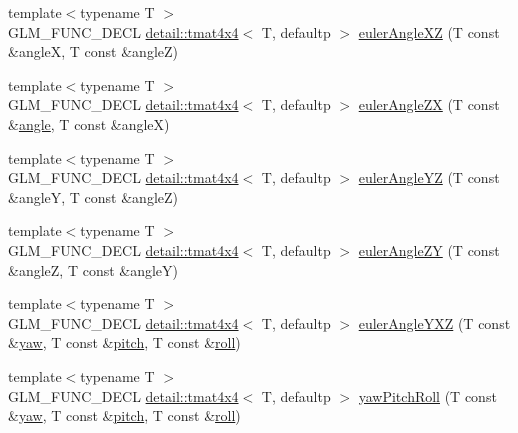 \begin{DoxyCompactItemize}
\item 
{\footnotesize template$<$typename T $>$ }\\G\+L\+M\+\_\+\+F\+U\+N\+C\+\_\+\+D\+E\+CL \hyperlink{structglm_1_1detail_1_1tmat4x4}{detail\+::tmat4x4}$<$ T, defaultp $>$ \hyperlink{group__gtx__euler__angles_ga61110cb520fbf21dd541cf4e25d81a65}{euler\+Angle\+XZ} (T const \&angleX, T const \&angleZ)
\item 
{\footnotesize template$<$typename T $>$ }\\G\+L\+M\+\_\+\+F\+U\+N\+C\+\_\+\+D\+E\+CL \hyperlink{structglm_1_1detail_1_1tmat4x4}{detail\+::tmat4x4}$<$ T, defaultp $>$ \hyperlink{group__gtx__euler__angles_ga5766bbe3f5b17b5c33ed21b2933ff278}{euler\+Angle\+ZX} (T const \&\hyperlink{group__gtc__quaternion_ga23a3fc7ada5bbb665ff84c92c6e0542c}{angle}, T const \&angleX)
\item 
{\footnotesize template$<$typename T $>$ }\\G\+L\+M\+\_\+\+F\+U\+N\+C\+\_\+\+D\+E\+CL \hyperlink{structglm_1_1detail_1_1tmat4x4}{detail\+::tmat4x4}$<$ T, defaultp $>$ \hyperlink{group__gtx__euler__angles_ga4bff0f8324770261d3a6ddadd790ec22}{euler\+Angle\+YZ} (T const \&angleY, T const \&angleZ)
\item 
{\footnotesize template$<$typename T $>$ }\\G\+L\+M\+\_\+\+F\+U\+N\+C\+\_\+\+D\+E\+CL \hyperlink{structglm_1_1detail_1_1tmat4x4}{detail\+::tmat4x4}$<$ T, defaultp $>$ \hyperlink{group__gtx__euler__angles_gaeabd76319f5a19188a0423769950df76}{euler\+Angle\+ZY} (T const \&angleZ, T const \&angleY)
\item 
{\footnotesize template$<$typename T $>$ }\\G\+L\+M\+\_\+\+F\+U\+N\+C\+\_\+\+D\+E\+CL \hyperlink{structglm_1_1detail_1_1tmat4x4}{detail\+::tmat4x4}$<$ T, defaultp $>$ \hyperlink{group__gtx__euler__angles_gab9bc80f4f579efd8f0d161e8b58ff452}{euler\+Angle\+Y\+XZ} (T const \&\hyperlink{group__gtc__quaternion_ga1de7653ddf380ff06d2300eea831664c}{yaw}, T const \&\hyperlink{group__gtc__quaternion_ga4d345dc369a54f53f5ebc375bac56d11}{pitch}, T const \&\hyperlink{group__gtc__quaternion_ga6d883e423bc425f4334fcce202131f7e}{roll})
\item 
{\footnotesize template$<$typename T $>$ }\\G\+L\+M\+\_\+\+F\+U\+N\+C\+\_\+\+D\+E\+CL \hyperlink{structglm_1_1detail_1_1tmat4x4}{detail\+::tmat4x4}$<$ T, defaultp $>$ \hyperlink{group__gtx__euler__angles_gaf6f927d06835272cd6a61ee3f8f65f5e}{yaw\+Pitch\+Roll} (T const \&\hyperlink{group__gtc__quaternion_ga1de7653ddf380ff06d2300eea831664c}{yaw}, T const \&\hyperlink{group__gtc__quaternion_ga4d345dc369a54f53f5ebc375bac56d11}{pitch}, T const \&\hyperlink{group__gtc__quaternion_ga6d883e423bc425f4334fcce202131f7e}{roll})

\end{DoxyCompactItemize}

